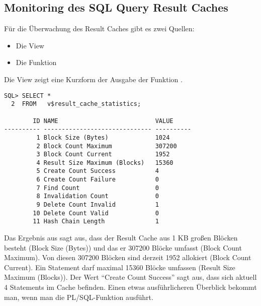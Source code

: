       \subsection{Monitoring des SQL Query Result Caches}
        Für die Überwachung des Result Caches gibt es zwei Quellen:
        \begin{itemize}
          \item Die View 
          \item Die Funktion 
        \end{itemize}
        Die View  zeigt eine Kurzform der Ausgabe der Funktion .
        \begin{lstlisting}[caption={\identifier{v\$result\_cache\_statistics}},label=admin706,language=oracle_sql]
SQL> SELECT *
  2  FROM   v$result_cache_statistics;

        ID NAME                           VALUE
---------- ------------------------------ ----------
         1 Block Size (Bytes)             1024
         2 Block Count Maximum            307200
         3 Block Count Current            1952
         4 Result Size Maximum (Blocks)   15360
         5 Create Count Success           4
         6 Create Count Failure           0
         7 Find Count                     0
         8 Invalidation Count             0
         9 Delete Count Invalid           1
        10 Delete Count Valid             0
        11 Hash Chain Length              1
        \end{lstlisting}
        Das Ergebnis aus  sagt aus, dass der Result Cache aus
        1 KB großen Blöcken besteht (Block Size (Bytes)) und das er 307200
        Blöcke umfasst (Block Count Maximum). Von diesen 307200 Blöcken sind
        derzeit 1952 allokiert (Block Count Current). Ein Statement darf maximal
        15360 Blöcke umfassen (Result Size Maximum (Blocks)). Der Wert
        \enquote{Create Count Success} sagt aus, dass sich aktuell 4 Statements
        im Cache befinden. Einen etwas ausführlicheren Überblick bekommt
        man, wenn man die PL/SQL-Funktion
         ausführt.
\clearpage
